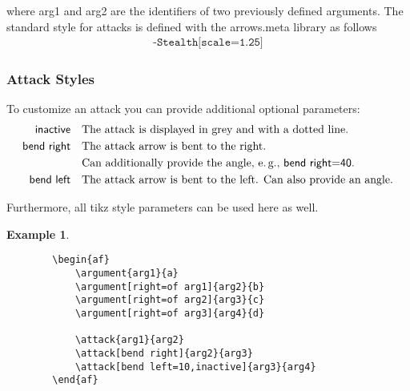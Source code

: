 \documentclass{article}
\newtheorem{example}{Example}
\begin{document}
    \noindent
    where \textsf{arg1} and \textsf{arg2} are the identifiers of two previously defined arguments.
    The \textsf{standard} style for attacks is defined with the \textsf{arrows.meta} library as follows
    \begin{align*}
        \texttt{-{Stealth[scale=1.25]}}
    \end{align*}

\subsubsection{Attack Styles}
    To customize an attack you can provide additional optional parameters:
    \begin{align*}
        \mathsf{inactive} &\quad \text{The attack is displayed in grey and with a dotted line.}\\
        \mathsf{bend~right} &\quad \text{The attack arrow is bent to the right.}\\
        &\quad \text{Can additionally provide the angle, e.\,g., \textsf{bend~right=40}.}\\
        \mathsf{bend~left} &\quad \text{The attack arrow is bent to the left. Can also provide an angle.}\\
    \end{align*}

    Furthermore, all \textsf{tikz} style parameters can be used here as well.

    \begin{example}~
    \begin{verbatim}
        \begin{af}
            \argument{arg1}{a}
            \argument[right=of arg1]{arg2}{b}
            \argument[right=of arg2]{arg3}{c}
            \argument[right=of arg3]{arg4}{d}
    
            \attack{arg1}{arg2}
            \attack[bend right]{arg2}{arg3}
            \attack[bend left=10,inactive]{arg3}{arg4}
        \end{af}    
    \end{verbatim}

    \begin{center}
        \begin{af}
    
        \end{af}
    \end{center}
    \end{example}
    
\end{document}
